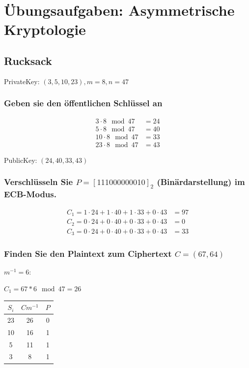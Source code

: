 \section{Übungsaufgaben: Asymmetrische Kryptologie}
\subsection{Rucksack}


PrivateKey: $(3,5,10,23), m= 8	, n = 47$

\subsubsection{Geben sie den öffentlichen Schlüssel an}

\begin{align}
	 3 \cdot 8 \mod 47 &= 24 \\
  	 5 \cdot 8 \mod 47 &= 40 \\
	10 \cdot 8 \mod 47 &= 33 \\
	23 \cdot 8 \mod 47 &= 43 	
\end{align}

PublicKey: $(24,40,33,43)$

\subsubsection{Verschlüsseln Sie $P=[1110 0000 0010]_2$ (Binärdarstellung) im ECB-Modus.}


\begin{align}
	C_1 = 1 \cdot 24 + 1  \cdot  40 + 1 \cdot 33 +0  \cdot 43 &= 97 \\ 
	C_2 = 0 \cdot 24 + 0  \cdot  40 + 0 \cdot 33 +0  \cdot 43 &= 0   \\ 	
	C_3 = 0 \cdot 24 + 0  \cdot  40 + 0 \cdot 33 +0  \cdot 43 &= 33 
\end{align}


\subsubsection{Finden Sie den Plaintext zum Ciphertext $C = (67, 64)$}


$m^{-1} = 6$:

$C_1= 67 * 6 \mod 47 = 26$

\begin{tabular}{ccc}
 $S_i$ & $Cm^{-1}$ & $P$ \\ \hline
 23    & 26  & 0  \\
 10    & 16  & 1  \\
 5     & 11  & 1  \\
 3     & 8   & 1  
\end{tabular}

